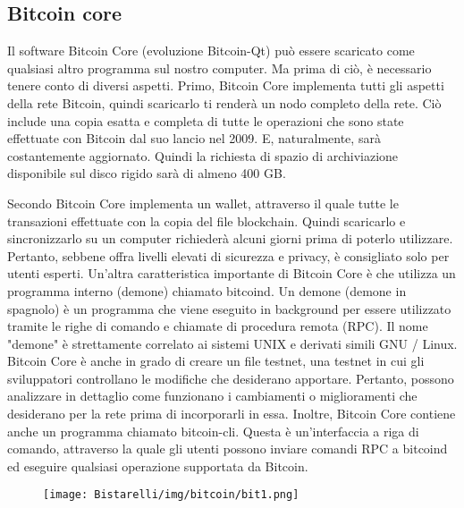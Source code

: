 \subsection{Bitcoin core}
Il software Bitcoin Core (evoluzione Bitcoin-Qt) può essere scaricato come qualsiasi altro programma sul nostro
computer. Ma prima di ciò, è necessario tenere conto di diversi aspetti. Primo, Bitcoin Core implementa tutti gli
aspetti della rete Bitcoin, quindi scaricarlo ti renderà un nodo completo della rete. Ciò include una copia esatta
e completa di tutte le operazioni che sono state effettuate con Bitcoin dal suo lancio nel 2009. E,
naturalmente, sarà costantemente aggiornato. Quindi la richiesta di spazio di archiviazione disponibile sul disco
rigido sarà di almeno 400 GB.

\singlespacing

Secondo Bitcoin Core implementa un wallet, attraverso il quale tutte le transazioni effettuate con la copia del
file blockchain. Quindi scaricarlo e sincronizzarlo su un computer richiederà alcuni giorni prima di poterlo utilizzare.
Pertanto, sebbene offra livelli elevati di sicurezza e privacy, è consigliato solo per utenti esperti.
Un'altra caratteristica importante di Bitcoin Core è che utilizza un programma interno (demone) chiamato bitcoind.
Un demone (demone in spagnolo) è un programma che viene eseguito in background per essere utilizzato tramite
le righe di comando e chiamate di procedura remota (RPC). Il nome "demone" è strettamente correlato ai
sistemi UNIX e derivati simili GNU / Linux. Bitcoin Core è anche in grado di creare un file testnet, una testnet in
cui gli sviluppatori controllano le modifiche che desiderano apportare. Pertanto, possono analizzare in dettaglio
come funzionano i cambiamenti o miglioramenti che desiderano per la rete prima di incorporarli in essa.
Inoltre, Bitcoin Core contiene anche un programma chiamato bitcoin-cli. Questa è un'interfaccia a riga di comando,
attraverso la quale gli utenti possono inviare comandi RPC a bitcoind ed eseguire qualsiasi operazione supportata
da Bitcoin.

\begin{figure}[H]
	\centering
    \texttt{[image: Bistarelli/img/bitcoin/bit1.png]}
\end{figure}

